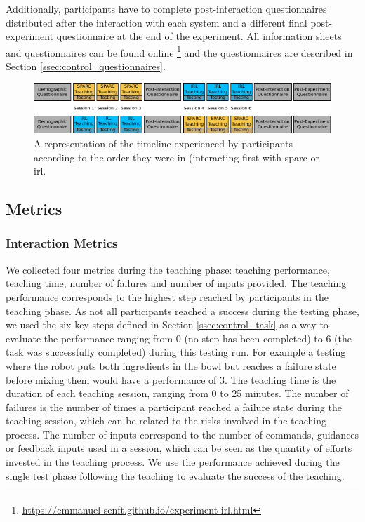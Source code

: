 Additionally, participants have to complete post-interaction questionnaires distributed after the interaction with each system and a different final post-experiment questionnaire at the end of the experiment. All information sheets and questionnaires can be found online \footnote{\url{https://emmanuel-senft.github.io/experiment-irl.html}} and the questionnaires are described in Section \ref{ssec:control_questionnaires}.

\begin{figure}[ht]
	\centering
	\includegraphics[width=1\textwidth]{protocol.pdf}
	\caption{A representation of the timeline experienced by participants according to the order they were in (interacting first with \gls{sparc} or \gls{irl}.}
	\label{fig:control_design}
\end{figure}

\subsection{Metrics}

\subsubsection{Interaction Metrics}

We collected four metrics during the teaching phase: teaching performance, teaching time, number of failures and number of inputs provided. The teaching performance corresponds to the highest step reached by participants in the teaching phase. As not all participants reached a success during the testing phase, we used the six key steps defined in Section \ref{ssec:control_task} as a way to evaluate the performance ranging from 0 (no step has been completed) to 6 (the task was successfully completed) during this testing run. For example a testing where the robot puts both ingredients in the bowl but reaches a failure state before mixing them would have a performance of 3. The teaching time is the duration of each teaching session, ranging from 0 to 25 minutes. The number of failures is the number of times a participant reached a failure state during the teaching session, which can be related to the risks involved in the teaching process. The number of inputs correspond to the number of commands, guidances or feedback inputs used in a session, which can be seen as the quantity of efforts invested in the teaching process. We use the performance achieved during the single test phase following the teaching to evaluate the success of the teaching. 

